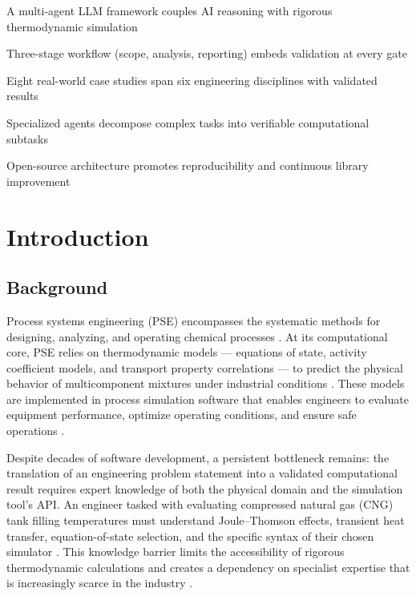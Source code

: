 \documentclass[review,3p]{elsarticle}
\begin{document}
\begin{frontmatter}
\begin{highlights}
\item A multi-agent LLM framework couples AI reasoning with rigorous thermodynamic simulation
\item Three-stage workflow (scope, analysis, reporting) embeds validation at every gate
\item Eight real-world case studies span six engineering disciplines with validated results
\item Specialized agents decompose complex tasks into verifiable computational subtasks
\item Open-source architecture promotes reproducibility and continuous library improvement
\end{highlights}

\end{frontmatter}

\section{Introduction}


\subsection{Background}

Process systems engineering (PSE) encompasses the systematic methods for designing, analyzing, and operating chemical processes \citep{Pistikopoulos2021}. At its computational core, PSE relies on thermodynamic models --- equations of state, activity coefficient models, and transport property correlations --- to predict the physical behavior of multicomponent mixtures under industrial conditions \citep{Michelsen2007}. These models are implemented in process simulation software that enables engineers to evaluate equipment performance, optimize operating conditions, and ensure safe operations \citep{SeiderLewinWidagdo2009}.

Despite decades of software development, a persistent bottleneck remains: the translation of an engineering problem statement into a validated computational result requires expert knowledge of both the physical domain and the simulation tool's API. An engineer tasked with evaluating compressed natural gas (CNG) tank filling temperatures must understand Joule–Thomson effects, transient heat transfer, equation-of-state selection, and the specific syntax of their chosen simulator \citep{SeiderLewinWidagdo2009}. This knowledge barrier limits the accessibility of rigorous thermodynamic calculations and creates a dependency on specialist expertise that is increasingly scarce in the industry \citep{Venkatasubramanian2019}.
\end{document}
